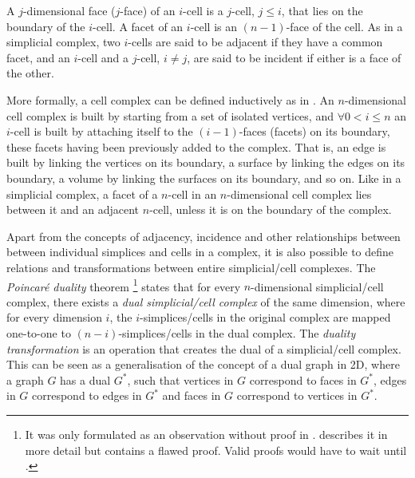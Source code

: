 A $j$-dimensional face ($j$-face) of an $i$-cell is a $j$-cell, $j \leq i$, that lies on the boundary of the $i$-cell.
A facet of an $i$-cell is an $(n-1)$-face of the cell.
As in a simplicial complex, two $i$-cells are said to be adjacent if they have a common facet, and an $i$-cell and a $j$-cell, $i \neq j$, are said to be incident if either is a face of the other.

More formally, a cell complex can be defined inductively as in \citet{Hatcher02}.
An $n$-dimensional cell complex is built by starting from a set of isolated vertices, and $\forall 0 < i \leq n$ an $i$-cell is built by attaching itself to the $(i-1)$-faces (facets) on its boundary, these facets having been previously added to the complex.
That is, an edge is built by linking the vertices on its boundary, a surface by linking the edges on its boundary, a volume by linking the surfaces on its boundary, and so on.
Like in a simplicial complex, a facet of a $n$-cell in an $n$-dimensional cell complex lies between it and an adjacent $n$-cell, unless it is on the boundary of the complex.

Apart from the concepts of adjacency, incidence and other relationships between between individual simplices and cells in a complex, it is also possible to define relations and transformations between entire simplicial/cell complexes.
The \emph{Poincar\'e duality} theorem \citep{Poincare93}\footnote{It was only formulated as an observation without proof in \citet{Poincare93}. \citet{Poincare95} describes it in more detail but contains a flawed proof.
Valid proofs would have to wait until \citet{Poincare99,Poincare00}.} states that for every $n$-dimensional simplicial/cell complex, there exists a \emph{dual simplicial/cell complex} of the same dimension, where for every dimension $i$, the $i$-simplices/cells in the original complex are mapped one-to-one to $(n-i)$-simplices/cells in the dual complex.
The \emph{duality transformation} is an operation that creates the dual of a simplicial/cell complex.
This can be seen as a generalisation of the concept of a dual graph in 2D, where a graph $G$ has a dual $G^\ast$, such that vertices in $G$ correspond to faces in $G^\ast$, edges in $G$ correspond to edges in $G^\ast$ and faces in $G$ correspond to vertices in $G^\ast$.

